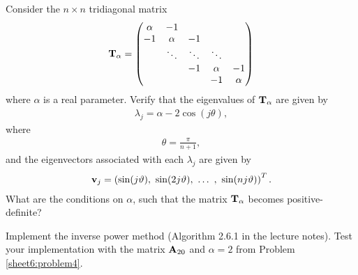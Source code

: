 \begin{Sheet}
	\begin{Problem}
		\label{sheet6:problem4}
		Consider the $n\times n$ tridiagonal matrix
		\begin{gather*}
		\mathbf T_{\alpha} =
		\begin{pmatrix}
		\alpha &     -1 &        &        & \\
		-1 & \alpha &     -1 &        & \\
		& \ddots & \ddots & \ddots & \\
		&        &     -1 & \alpha &     -1 \\
		&        &        &     -1 & \alpha
		\end{pmatrix}
		\end{gather*}
		where $\alpha$ is a real parameter. Verify that the eigenvalues of
		$\mathbf T_{\alpha}$ are given by
		\begin{gather*}
		\lambda_j = \alpha - 2\cos(j\theta),
		\end{gather*}
		where
		\begin{gather*}
		\theta = \frac\pi{n+1},
		\end{gather*}
		and the eigenvectors associated with each $\lambda_j$ are given by
		\begin{gather*}
		\mathbf v_j = \left(
		\sin(j\vartheta),\ \sin(2j\vartheta),\ \ldots\ ,\ \sin(nj\vartheta)
		\right)^T.
		\end{gather*}
		What are the conditions on $\alpha$, such that the matrix
		$\mathbf T_{\alpha}$ becomes positive-definite?
	\end{Problem}

	\begin{Problem}
		Implement the inverse power method (Algorithm 2.6.1 in the lecture notes).
		Test your implementation with the matrix $\mathbf A_{20}$ and $\alpha=2$ from Problem \ref{sheet6:problem4}.
	\end{Problem}

\end{Sheet}


